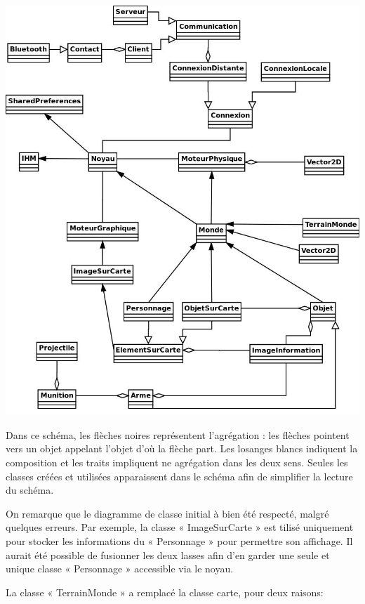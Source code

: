 \documentclass{report}
\begin{document}
\includegraphics[scale=0.5]{images/graph5}

Dans ce schéma, les flèches noires représentent l’agrégation : les
flèches pointent vers un objet appelant l’objet d’où la flèche part.
Les losanges blancs indiquent la composition et les traits impliquent
ne agrégation dans les deux sens. Seules les classes créées et utilisées
apparaissent dans le schéma afin de simplifier la lecture du schéma.

On remarque que le diagramme de classe initial à bien été respecté,
malgré quelques erreurs. Par exemple, la classe « ImageSurCarte » est
tilisé uniquement pour stocker les informations du « Personnage » pour
permettre son affichage. Il aurait été possible de fusionner les deux
lasses afin d’en garder une seule et unique classe « Personnage »
accessible via le noyau.

La classe « TerrainMonde » a remplacé la classe carte, pour deux
raisons:
\end{document}
